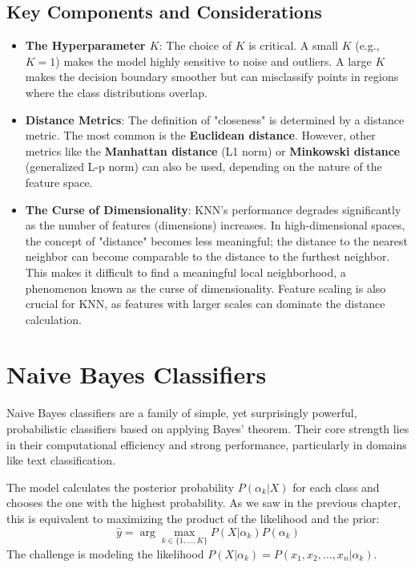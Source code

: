 \subsection*{Key Components and Considerations}
\begin{itemize}
    \item \textbf{The Hyperparameter $K$}: The choice of $K$ is critical. A small $K$ (e.g., $K=1$) makes the model highly sensitive to noise and outliers. A large $K$ makes the decision boundary smoother but can misclassify points in regions where the class distributions overlap.
    \item \textbf{Distance Metrics}: The definition of "closeness" is determined by a distance metric. The most common is the \textbf{Euclidean distance}. However, other metrics like the \textbf{Manhattan distance} (L1 norm) or \textbf{Minkowski distance} (generalized L-p norm) can also be used, depending on the nature of the feature space.
    \item \textbf{The Curse of Dimensionality}: KNN's performance degrades significantly as the number of features (dimensions) increases. In high-dimensional spaces, the concept of "distance" becomes less meaningful; the distance to the nearest neighbor can become comparable to the distance to the furthest neighbor. This makes it difficult to find a meaningful local neighborhood, a phenomenon known as the curse of dimensionality. Feature scaling is also crucial for KNN, as features with larger scales can dominate the distance calculation.
\end{itemize}

\section{Naive Bayes Classifiers}
\label{sec:naive_bayes}
Naive Bayes classifiers are a family of simple, yet surprisingly powerful, probabilistic classifiers based on applying Bayes' theorem. Their core strength lies in their computational efficiency and strong performance, particularly in domains like text classification.

The model calculates the posterior probability $P(\alpha_k | X)$ for each class and chooses the one with the highest probability. As we saw in the previous chapter, this is equivalent to maximizing the product of the likelihood and the prior:
$$ \hat{y} = \arg\max_{k \in \{1, \dots, K\}} P(X | \alpha_k) P(\alpha_k) $$
The challenge is modeling the likelihood $P(X | \alpha_k) = P(x_1, x_2, \dots, x_n | \alpha_k)$.

